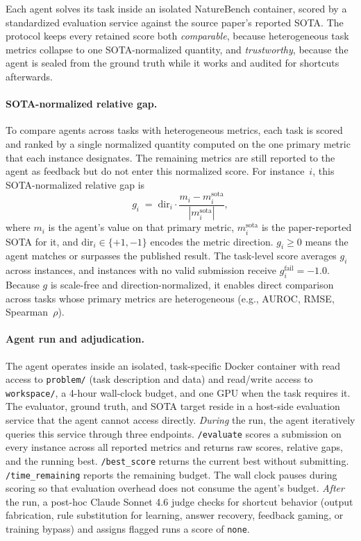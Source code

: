 \documentclass{llmxive}
\providecommand{\gimp}{g}
\begin{document}
Each agent solves its task inside an isolated NatureBench container, scored by a standardized evaluation service against the source paper's reported SOTA.
The protocol keeps every retained score both \emph{comparable}, because heterogeneous task metrics collapse to one SOTA-normalized quantity, and \emph{trustworthy}, because the agent is sealed from the ground truth while it works and audited for shortcuts afterwards.

\paragraph{SOTA-normalized relative gap.}
To compare agents across tasks with heterogeneous metrics, each task is scored and ranked by a single normalized quantity computed on the one primary metric that each instance designates. The remaining metrics are still reported to the agent as feedback but do not enter this normalized score.
For instance~$i$, this SOTA-normalized relative gap is
\begin{equation}
  \gimp_i \;=\; \mathrm{dir}_i \cdot \frac{m_i - m_i^{\mathrm{sota}}}{|m_i^{\mathrm{sota}}|},
\end{equation}
where $m_i$ is the agent's value on that primary metric, $m_i^{\mathrm{sota}}$ is the paper-reported SOTA for it, and $\mathrm{dir}_i \in \{+1, -1\}$ encodes the metric direction.
$\gimp_i \geq 0$ means the agent matches or surpasses the published result.
The task-level score averages $\gimp_i$ across instances, and instances with no valid submission receive $\gimp_i^{\mathrm{fail}} = -1.0$.
Because $\gimp$ is scale-free and direction-normalized, it enables direct comparison across tasks whose primary metrics are heterogeneous (e.g., AUROC, RMSE, Spearman~$\rho$).

\paragraph{Agent run and adjudication.}
The agent operates inside an isolated, task-specific Docker container with read access to \texttt{problem/} (task description and data) and read/write access to \texttt{workspace/}, a 4-hour wall-clock budget, and one GPU when the task requires it. The evaluator, ground truth, and SOTA target reside in a host-side evaluation service that the agent cannot access directly.
\emph{During} the run, the agent iteratively queries this service through three endpoints. \texttt{/evaluate} scores a submission on every instance across all reported metrics and returns raw scores, relative gaps, and the running best. \texttt{/best\_score} returns the current best without submitting. \texttt{/time\_remaining} reports the remaining budget. The wall clock pauses during scoring so that evaluation overhead does not consume the agent's budget.
\emph{After} the run, a post-hoc Claude Sonnet 4.6 judge checks for shortcut behavior (output fabrication, rule substitution for learning, answer recovery, feedback gaming, or training bypass) and assigns flagged runs a score of \texttt{none}.
\end{document}
